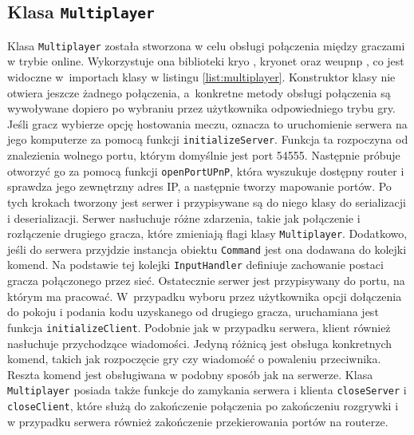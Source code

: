\subsection{Klasa \texttt{Multiplayer}}
Klasa \texttt{Multiplayer} została stworzona w celu obsługi połączenia między graczami w trybie online. Wykorzystuje ona biblioteki kryo \cite{Kryo}, kryonet \cite{Kryonet} oraz weupnp \cite{weupnp}, co jest widoczne w~importach klasy w listingu \ref{list:multiplayer}. Konstruktor klasy nie otwiera jeszcze żadnego połączenia, a~konkretne metody obsługi połączenia są wywoływane dopiero po wybraniu przez użytkownika odpowiedniego trybu gry. 
Jeśli gracz wybierze opcję hostowania meczu, oznacza to uruchomienie serwera na jego komputerze za pomocą funkcji \texttt{initializeServer}. Funkcja ta rozpoczyna od znalezienia wolnego portu, którym domyślnie jest port 54555. Następnie próbuje otworzyć go za pomocą funkcji \texttt{openPortUPnP}, która wyszukuje dostępny router i sprawdza jego zewnętrzny adres IP, a następnie tworzy mapowanie portów. Po tych krokach tworzony jest serwer i przypisywane są do niego klasy do serializacji i deserializacji. Serwer nasłuchuje różne zdarzenia, takie jak połączenie i rozłączenie drugiego gracza, które zmieniają flagi klasy \texttt{Multiplayer}. Dodatkowo, jeśli do serwera przyjdzie instancja obiektu \texttt{Command} jest ona dodawana do kolejki komend. Na podstawie tej kolejki \texttt{InputHandler} definiuje zachowanie postaci gracza połączonego przez sieć. Ostatecznie serwer jest przypisywany do portu, na którym ma pracować. 
W~przypadku wyboru przez użytkownika opcji dołączenia do pokoju i podania kodu uzyskanego od drugiego gracza, uruchamiana jest funkcja \texttt{initializeClient}. Podobnie jak w przypadku serwera, klient również nasłuchuje przychodzące wiadomości. Jedyną różnicą jest obsługa konkretnych komend, takich jak rozpoczęcie gry czy wiadomość o powaleniu przeciwnika. Reszta komend jest obsługiwana w podobny sposób jak na serwerze. 
Klasa \texttt{Multiplayer} posiada także funkcje do zamykania serwera i klienta \texttt{closeServer} i \texttt{closeClient}, które służą do zakończenie połączenia po zakończeniu rozgrywki i w przypadku serwera również zakończenie przekierowania portów na routerze.

